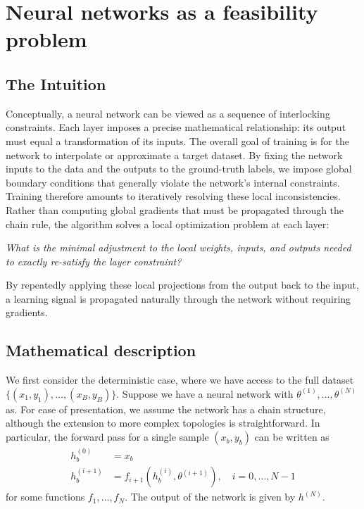 \chapter{Neural networks as a feasibility problem} \label{sec:nn_feas}

\section{The Intuition}
Conceptually, a neural network can be viewed as a sequence of interlocking constraints. Each layer imposes a precise mathematical relationship: its output must equal a transformation of its inputs. The overall goal of training is for the network to interpolate or approximate a target dataset. By fixing the network inputs to the data and the outputs to the ground-truth labels, we impose global boundary conditions that generally violate the network's internal constraints. Training therefore amounts to iteratively resolving these local inconsistencies.  Rather than computing global gradients that must be propagated through the chain rule, the algorithm solves a local optimization problem at each layer: 
\vspace{0.5em}

\textit{What is the minimal adjustment to the local weights, inputs, and outputs needed to exactly re-satisfy the layer constraint?}

\vspace{0.5em}
By repeatedly applying these local projections from the output back to the input, a learning signal is propagated naturally through the network without requiring gradients.

\section{Mathematical description} \label{sec:math_desc}

We first consider the deterministic case, where we have access to the full dataset $\{(x_1, y_1), \ldots, (x_B, y_B)\}$. Suppose we have a neural network with $\theta^{(1)}, \ldots, \theta^{(N)}$ as. For ease of presentation, we assume the network has a chain structure, although the extension to more complex topologies is straightforward. In particular, the forward pass for a single sample $(x_b, y_b)$ can be written as
\begin{align*}
    h^{(0)}_b &= x_b \\
    h^{(i+1)}_b &= f_{i+1}(h^{(i)}_b, \theta^{(i+1)}), \quad 
    i=0,\ldots,N-1
\end{align*}
for some functions $f_1, \ldots, f_N$. The output of the network is given by $h^{(N)}$.

